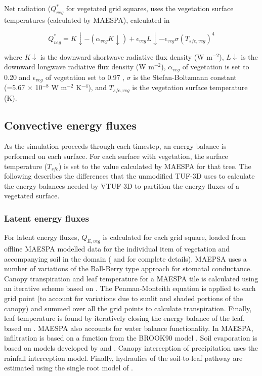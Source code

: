 \documentclass[final,3p,times,authoryear]{elsarticle}
\begin{document}
Net radiation ($Q^{*}_{veg}$ for vegetated grid squares, uses the vegetation surface temperatures (calculated by MAESPA), calculated in 

\begin{equation}\label{eq:rnet}
Q^{*}_{veg} = K\downarrow - (\alpha _{veg} K\downarrow) + \epsilon _{veg} L\downarrow - \epsilon _{veg} \sigma  (T_{sfc,veg}) ^{4} 
\end{equation}

where $K\downarrow$ is the downward shortwave radiative flux density (W m$^{-2}$), $L\downarrow$ is the downward longwave radiative flux density (W m$^{-2}$), $\alpha _{veg}$ of vegetation is set to 0.20 and $\epsilon _{veg}$ of vegetation set to 0.97 \citep[p. 12]{Oke1987z}, $\sigma$ is the Stefan-Boltzmann constant (=5.67 $\times$ 10$^{-8}$ W m$^{-2}$ K$^{-4}$), and $T_{sfc,veg}$ is the vegetation surface temperature (K).




\subsection{Convective energy fluxes}

As the simulation proceeds through each timestep, an energy balance is performed on each surface. For each surface with vegetation, the surface temperature ($T_{sfc}$) is set to the value calculated by MAESPA for that tree. The following describes the differences that the unmodified TUF-3D uses to calculate the energy balances needed by VTUF-3D to partition the energy fluxes of a vegetated surface.

\subsubsection{Latent energy fluxes}
\label{sec:calcleaftemp}
\label{sec:waterbalance}

For latent energy fluxes, $Q_{E,veg}$ is calculated for each grid square, loaded from offline MAESPA modelled data for the individual item of vegetation and accompanying soil in the domain (\cite{Duursma2012} and \cite{Medlyn2007} for complete details). MAEPSA uses a number of variations of the Ball-Berry type approach \citep{Ball1987,Duursma2012} for stomatal conductance. Canopy transpiration and leaf temperature for a MAESPA tile is calculated using an iterative scheme based on \cite{Wang1998}. The Penman-Monteith equation \citep{Penman1948,Monteith1965} is applied to each grid point (to account for variations due to sunlit and shaded portions of the canopy) and summed over all the grid points to calculate transpiration. Finally, leaf temperature is found by iteratively closing the energy balance of the leaf, based on \cite{Wang1998}. MAESPA also accounts for water balance functionality. In MAESPA, infiltration is based on a function from the BROOK90 model \citep{Federer2003}. Soil evaporation is based on models developed by \cite{Choudhury1988} and \cite{Williams2001}. Canopy interception of precipitation uses the \cite{Rutter1975} rainfall interception model. Finally, hydraulics of the soil-to-leaf pathway are estimated using the single root model of \cite{Gardner1960}.
\end{document}
